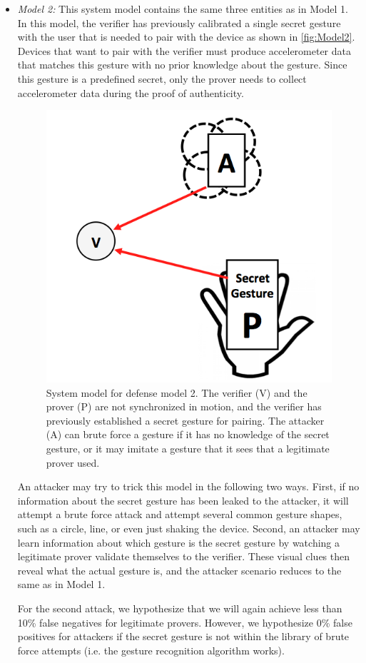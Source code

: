 \begin{itemize}
\item \emph{Model 2:} This system model contains the same three entities as in Model 1. In this model, the verifier has previously calibrated a single secret gesture with the user that is needed to pair with the device as shown in \autoref{fig:Model2}. Devices that want to pair with the verifier must produce accelerometer data that matches this gesture with no prior knowledge about the gesture. Since this gesture is a predefined secret, only the prover needs to collect accelerometer data during the proof of authenticity.

\begin{figure}[!tb]
\centering
\includegraphics[width=0.6 \linewidth]{./figures/model2.png}
\caption{System model for defense model 2. The verifier (V) and the prover (P) are not synchronized in motion, and the verifier has previously established a secret gesture for pairing. The attacker (A) can brute force a gesture if it has no knowledge of the secret gesture, or it may imitate a gesture that it sees that a legitimate prover used.}
\label{fig:Model2}
\end{figure}

An attacker may try to trick this model in the following two ways. First, if no information about the secret gesture has been leaked to the attacker, it will attempt a brute force attack and attempt several common gesture shapes, such as a circle, line, or even just shaking the device. Second, an attacker may learn information about which gesture is the secret gesture by watching a legitimate prover validate themselves to the verifier. These visual clues then reveal what the actual gesture is, and the attacker scenario reduces to the same as in Model 1. 

For the second attack, we hypothesize that we will again achieve less than 10\% false negatives for legitimate provers. However, we hypothesize 0\% false positives for attackers if the secret gesture is not within the library of brute force attempts (i.e. the gesture recognition algorithm works). 


\end{itemize}
